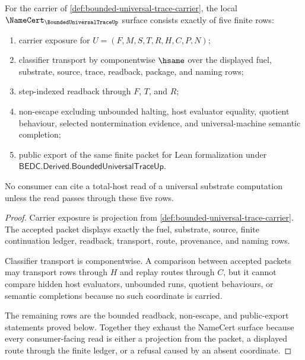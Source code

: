 \begin{theorem}
\label{thm:bounded-universal-trace-namecert-obligations}
For the carrier of \autoref{def:bounded-universal-trace-carrier}, the local $\NameCert_{\BoundedUniversalTraceUp}$ surface consists exactly of five finite rows:
\begin{enumerate}
\item carrier exposure for $U=(F,M,S,T,R,H,C,P,N)$;
\item classifier transport by componentwise $\hsame$ over the displayed fuel, substrate, source, trace, readback, package, and naming rows;
\item step-indexed readback through $F$, $T$, and $R$;
\item non-escape excluding unbounded halting, host evaluator equality, quotient behaviour, selected nontermination evidence, and universal-machine semantic completion;
\item public export of the same finite packet for Lean formalization under $\mathsf{BEDC.Derived.BoundedUniversalTraceUp}$.
\end{enumerate}
No consumer can cite a total-host read of a universal substrate computation unless the read passes through these five rows.
\end{theorem}
\begin{proof}
Carrier exposure is projection from \autoref{def:bounded-universal-trace-carrier}. The accepted packet displays exactly the fuel, substrate, source, finite continuation ledger, readback, transport, route, provenance, and naming rows.

Classifier transport is componentwise. A comparison between accepted packets may transport rows through $H$ and replay routes through $C$, but it cannot compare hidden host evaluators, unbounded runs, quotient behaviours, or semantic completions because no such coordinate is carried.

The remaining rows are the bounded readback, non-escape, and public-export statements proved below. Together they exhaust the NameCert surface because every consumer-facing read is either a projection from the packet, a displayed route through the finite ledger, or a refusal caused by an absent coordinate.
\end{proof}

